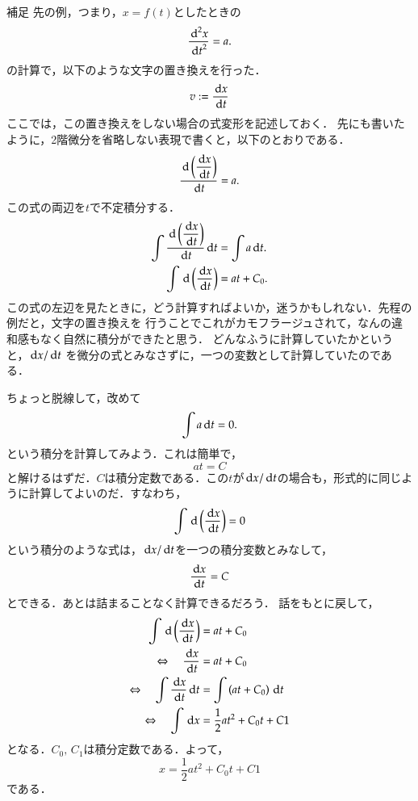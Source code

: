             \begin{memo}{補足}
                先の例，つまり，$x=f(t)$としたときの
                \[
                    \frac{{\,\mathrm{d}}^{2} x}{{\,\mathrm{d} t}^{2}} = a.
                \]
                の計算で，以下のような文字の置き換えを行った．
                \[
                    v := \frac{\,\mathrm{d} x}{\,\mathrm{d} t}
                \]
                ここでは，この置き換えをしない場合の式変形を記述しておく．
                先にも書いたように，2階微分を省略しない表現で書くと，以下のとおりである．
                \[
                    \frac{\,\mathrm{d} \displaystyle \left(\frac{\,\mathrm{d} x}{\,\mathrm{d} t}\right)}{\,\mathrm{d} t}= a.
                \]
                この式の両辺を$t$で不定積分する．
                \begin{align*}
                    \int \frac{\,\mathrm{d} \displaystyle \left(\frac{\,\mathrm{d} x}{\,\mathrm{d} t}\right)}{\,\mathrm{d} t} \,\mathrm{d} t &= \int a \,\mathrm{d} t. \\
                    \int \,\mathrm{d} \displaystyle \left (\frac{\,\mathrm{d} x}{\,\mathrm{d} t}\right) &= at + {C}_{0}.
                \end{align*}
                この式の左辺を見たときに，どう計算すればよいか，迷うかもしれない．先程の例だと，文字の置き換えを
                行うことでこれがカモフラージュされて，なんの違和感もなく自然に積分ができたと思う．
                どんなふうに計算していたかというと，$\,\mathrm{d} x/\,\mathrm{d} t$ を微分の式とみなさずに，一つの変数として計算していたのである．

                ちょっと脱線して，改めて
                \[
                    \int a \,\mathrm{d} t = 0.    
                \]
                という積分を計算してみよう．これは簡単で，
                \[
                    at = C
                \]
                と解けるはずだ．$C$は積分定数である．この$t$が$\,\mathrm{d} x/\,\mathrm{d} t$の場合も，形式的に同じように計算してよいのだ．すなわち，
                \[
                    \int \,\mathrm{d} \displaystyle \left( \frac{\,\mathrm{d} x}{\,\mathrm{d} t} \right)= 0
                \]
                という積分のような式は，$\,\mathrm{d} x/\,\mathrm{d} t$を一つの積分変数とみなして，
                \[
                    \frac{\,\mathrm{d} x}{\,\mathrm{d} t} = C
                \]
                とできる．あとは詰まることなく計算できるだろう．
                話をもとに戻して，
                \begin{align*}
                    \int \,\mathrm{d} \displaystyle \left (\frac{\,\mathrm{d} x}{\,\mathrm{d} t}\right) &= at + {C}_{0} \\
                    \Leftrightarrow \quad \frac{\,\mathrm{d} x}{\,\mathrm{d} t} &= at + {C}_{0} \\
                    \Leftrightarrow \quad \int \frac{\,\mathrm{d} x}{\,\mathrm{d} t} \,\mathrm{d} t &=  \int \left(at + {C}_{0} \right)\,\mathrm{d} t\\
                    \Leftrightarrow \quad \int \,\mathrm{d} x &= \frac{1}{2}a{t}^{2} + {C}_{0}t + C{1} \\
                \end{align*}
                となる．${C}_{0},\,{C}_{1}$は積分定数である．よって，
                \[
                    x = \frac{1}{2}a{t}^{2} + {C}_{0}t + C{1}
                \]
                である．
 



            \end{memo}


